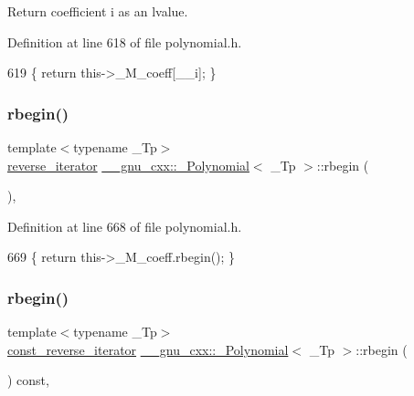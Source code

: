 Return coefficient {\ttfamily i} as an lvalue. 

Definition at line 618 of file polynomial.\+h.


\begin{DoxyCode}
619       \{ \textcolor{keywordflow}{return} this->\_M\_coeff[\_\_i]; \}
\end{DoxyCode}
\mbox{\label{class____gnu__cxx_1_1__Polynomial_a10924e0d5e228684c721a4bba73a7af3}} 
\subsubsection{\texorpdfstring{rbegin()}{rbegin()}\hspace{0.1cm}{\footnotesize\ttfamily [1/2]}}
{\footnotesize\ttfamily template$<$typename \+\_\+\+Tp$>$ \\
\hyperlink{class____gnu__cxx_1_1__Polynomial_aed8f7d97c575d5c34c54170631953415}{reverse\+\_\+iterator} \hyperlink{class____gnu__cxx_1_1__Polynomial}{\+\_\+\+\_\+gnu\+\_\+cxx\+::\+\_\+\+Polynomial}$<$ \+\_\+\+Tp $>$\+::rbegin (\begin{DoxyParamCaption}{ }\end{DoxyParamCaption})\hspace{0.3cm}{\ttfamily [inline]}, {\ttfamily [noexcept]}}



Definition at line 668 of file polynomial.\+h.


\begin{DoxyCode}
669       \{ \textcolor{keywordflow}{return} this->\_M\_coeff.rbegin(); \}
\end{DoxyCode}
\mbox{\label{class____gnu__cxx_1_1__Polynomial_ab5cd3c6e861ebf3adac38e3df4e099aa}} 
\subsubsection{\texorpdfstring{rbegin()}{rbegin()}\hspace{0.1cm}{\footnotesize\ttfamily [2/2]}}
{\footnotesize\ttfamily template$<$typename \+\_\+\+Tp$>$ \\
\hyperlink{class____gnu__cxx_1_1__Polynomial_a2a042a80127ab9a7b0349a54791e59af}{const\+\_\+reverse\+\_\+iterator} \hyperlink{class____gnu__cxx_1_1__Polynomial}{\+\_\+\+\_\+gnu\+\_\+cxx\+::\+\_\+\+Polynomial}$<$ \+\_\+\+Tp $>$\+::rbegin (\begin{DoxyParamCaption}{ }\end{DoxyParamCaption}) const\hspace{0.3cm}{\ttfamily [inline]}, {\ttfamily [noexcept]}}



